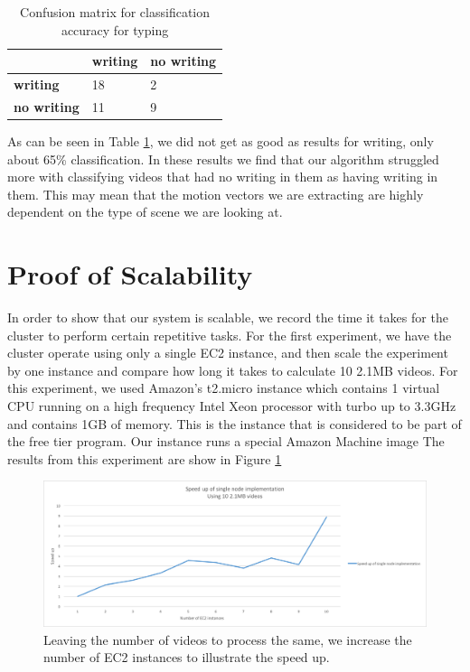 \begin{table}[h]
  \begin{centering}
  \label{table:writing_confusion}
  \begin{tabular}{| l | l | l |}
  \hline
   & \textbf{writing} & \textbf{no writing}\\ \hline
  \textbf{writing} & 18 & 2 \\ \hline
  \textbf{no writing} & 11 & 9 \\ \hline
  \end{tabular}
  \caption{Confusion matrix for classification accuracy for typing}
\end{centering}
\end{table}

As can be seen in Table \ref{table:writing_confusion}, we did not get as good
as results for writing, only about 65\% classification. In these results we
find that our algorithm struggled more with classifying videos that had no
writing in them as having writing in them. This may mean that the motion vectors
we are extracting are highly dependent on the type of scene we are looking at.

\section{\label{section:scalability}Proof of Scalability}
In order to show that our system is scalable, we record the time it takes
for the cluster to perform certain repetitive tasks. For the first experiment,
we have the cluster operate using only a single EC2 instance, and then scale
the experiment by one instance and compare how long it takes to calculate 10 2.1MB
videos. For this experiment, we used Amazon's t2.micro instance which contains
1 virtual CPU running on a high frequency Intel Xeon processor with turbo
up to 3.3GHz and contains 1GB of memory. This is the instance that is considered
to be part of the free tier program. Our instance runs a special Amazon Machine
image
The results from this experiment are show in Figure \ref{fig:speed_up}

\begin{figure}[h]
  \label{fig:speed_up}
  \centering
  \includegraphics[width=\textwidth]{figures/speed_up}
  \caption{Leaving the number of videos to process the same, we increase the
  number of EC2 instances to illustrate the speed up.}
\end{figure}

